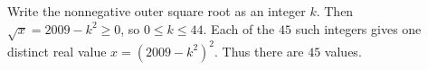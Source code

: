 Write the nonnegative outer square root as an integer $k$. Then $\sqrt x=2009-k^2\ge0$, so $0\le k\le44$. Each of the $45$ such integers gives one distinct real value $x=(2009-k^2)^2$. Thus there are $\boxed{45}$ values.
